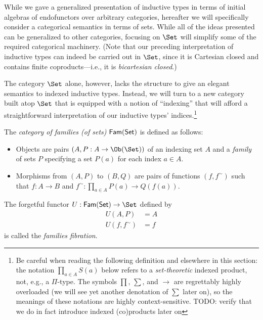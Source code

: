 
While we gave a generalized presentation of inductive types in terms of initial algebras of
endofunctors over arbitrary categories, hereafter we will specifically consider a categorical
semantics in terms of sets. While all of the ideas presented can be generalized to other categories,
focusing on $\Set$ will simplify some of the required categorical machinery. (Note that our
preceding interpretation of inductive types can indeed be carried out in $\Set$, since it is
Cartesian closed and contains finite coproducts---i.e., it is \emph{bicartesian closed}.)

The category $\Set$ alone, however, lacks the structure to give an elegant semantics to indexed
inductive types. Instead, we will turn to a new category built atop $\Set$ that is equipped with a
notion of ``indexing'' that will afford a straightforward interpretation of our inductive types'
indices.\footnote{Be careful when reading the following definition and elsewhere in this section:
the notation $\prod_{a \in A} S(a)$ below refers to a \emph{set-theoretic} indexed product, not,
e.g., a $\Pi$-type. The symbols $\prod$, $\sum$, and $\to$ are regrettably highly overloaded (we
will see yet another denotation of $\sum$ later on), so the meanings of these notations are highly
context-sensitive. TODO: verify that we do in fact introduce indexed (co)products later on}

\begin{definition}
  The \emph{category of families (of sets)} $\mathsf{Fam}(\mathsf{Set})$ is defined as follows:
  \begin{itemize}
    \item Objects are pairs $(A, P : A \to \Ob(\Set))$ of an indexing set $A$ and a \emph{family} of
          sets $P$ specifying a set $P(a)$ for each index $a \in A$.
    \item Morphisms from $(A, P)$ to $(B, Q)$ are pairs of functions $(f, f^\sim)$ such that $f : A
          \to B$ and $f^\sim : \prod_{a \in A} P(a) \to Q(f(a))$.
  \end{itemize}

  \noindent The forgetful functor $U : \FamSet \to \Set$ defined by
  \begin{align*}
    U(A, P) &= A\\
    U(f, f^\sim) &= f
  \end{align*}
  is called the \emph{families fibration}.
\end{definition}

